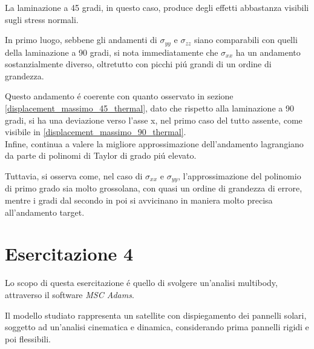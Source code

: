 \documentclass{article}
\begin{document}
            La laminazione a 45 gradi, in questo caso, produce degli effetti abbastanza visibili 
            sugli stress normali. 

            In primo luogo, sebbene gli andamenti di $\sigma_{yy}$ e $\sigma_{zz}$ siano comparabili con quelli della laminazione a 90 gradi, si nota immediatamente che 
            $\sigma_{xx}$ ha un andamento sostanzialmente diverso, oltretutto con picchi piú grandi di un ordine di grandezza. 

            Questo andamento é coerente con quanto osservato in sezione \ref{displacement_massimo_45_thermal}, dato che rispetto alla laminazione
            a 90 gradi, si ha una deviazione verso l'asse x, nel primo caso del tutto assente, come visibile in \ref{displacement_massimo_90_thermal}. \\ 

            Infine, continua a valere la migliore approssimazione dell'andamento lagrangiano da parte di polinomi di Taylor 
            di grado piú elevato.

            Tuttavia, si osserva come, nel caso di $\sigma_{xx}$ e $\sigma_{yy}$, l'approssimazione del polinomio di primo grado
            sia molto grossolana, con quasi un ordine di grandezza di errore, mentre i gradi dal secondo in poi si avvicinano in maniera
            molto precisa all'andamento target.
            


            \clearpage            
        
        \section{Esercitazione 4\label{Esercitazione4}}

        Lo scopo di questa esercitazione é quello di svolgere un'analisi multibody, attraverso il software \textit{MSC Adams}.

        Il modello studiato rappresenta un satellite con dispiegamento dei pannelli solari, soggetto ad un'analisi cinematica e dinamica, 
        considerando prima pannelli rigidi e poi flessibili.
\end{document}
